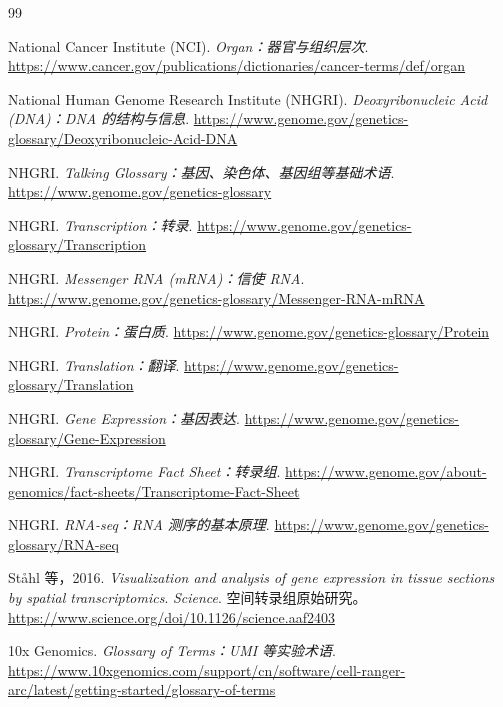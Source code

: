 \documentclass[UTF8,a4paper,11pt,fontset=fandol]{ctexart}
\begin{document}
\begingroup
\linespread{1.04}\selectfont
\small
\setlength{\parskip}{0.25em}
\renewcommand{\section}[2]{}
\begin{thebibliography}{99}
\setlength{\itemsep}{0.15em}

National Cancer Institute (NCI).
\textit{Organ：器官与组织层次}.
\url{https://www.cancer.gov/publications/dictionaries/cancer-terms/def/organ}

National Human Genome Research Institute (NHGRI).
\textit{Deoxyribonucleic Acid (DNA)：DNA 的结构与信息}.
\url{https://www.genome.gov/genetics-glossary/Deoxyribonucleic-Acid-DNA}

NHGRI.
\textit{Talking Glossary：基因、染色体、基因组等基础术语}.
\url{https://www.genome.gov/genetics-glossary}

NHGRI. \textit{Transcription：转录}.
\url{https://www.genome.gov/genetics-glossary/Transcription}

NHGRI. \textit{Messenger RNA (mRNA)：信使 RNA}.
\url{https://www.genome.gov/genetics-glossary/Messenger-RNA-mRNA}

NHGRI. \textit{Protein：蛋白质}.
\url{https://www.genome.gov/genetics-glossary/Protein}

NHGRI. \textit{Translation：翻译}.
\url{https://www.genome.gov/genetics-glossary/Translation}

NHGRI. \textit{Gene Expression：基因表达}.
\url{https://www.genome.gov/genetics-glossary/Gene-Expression}

NHGRI. \textit{Transcriptome Fact Sheet：转录组}.
\url{https://www.genome.gov/about-genomics/fact-sheets/Transcriptome-Fact-Sheet}

NHGRI. \textit{RNA-seq：RNA 测序的基本原理}.
\url{https://www.genome.gov/genetics-glossary/RNA-seq}

Ståhl 等，2016.
\textit{Visualization and analysis of gene expression in tissue sections by spatial transcriptomics}.
\textit{Science}. 空间转录组原始研究。
\url{https://www.science.org/doi/10.1126/science.aaf2403}

10x Genomics.
\textit{Glossary of Terms：UMI 等实验术语}.
\url{https://www.10xgenomics.com/support/cn/software/cell-ranger-arc/latest/getting-started/glossary-of-terms}


\end{thebibliography}
\end{document}
